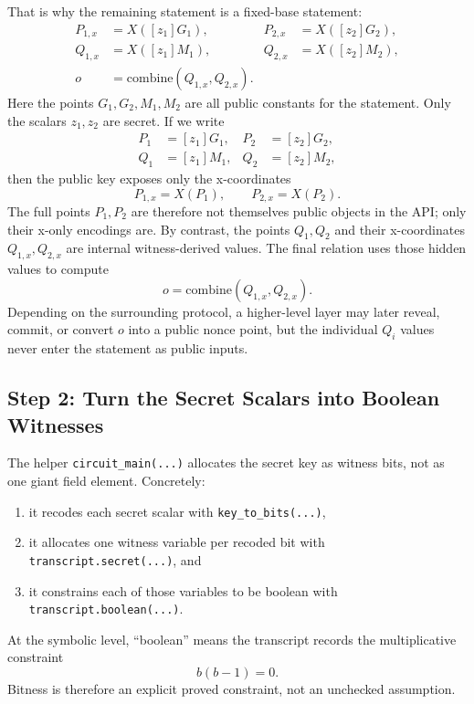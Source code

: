 \documentclass[11pt]{article}
\begin{document}
That is why the remaining statement is a fixed-base statement:
\[
\begin{aligned}
P_{1,x} &= X([z_1]G_1), & P_{2,x} &= X([z_2]G_2), \\
Q_{1,x} &= X([z_1]M_1), & Q_{2,x} &= X([z_2]M_2), \\
o &= \mathrm{combine}(Q_{1,x}, Q_{2,x}). &&
\end{aligned}
\]
Here the points $G_1,G_2,M_1,M_2$ are all public constants for the statement. Only the scalars
$z_1,z_2$ are secret. If we write
\[
\begin{aligned}
P_1 &= [z_1]G_1, & P_2 &= [z_2]G_2, \\
Q_1 &= [z_1]M_1, & Q_2 &= [z_2]M_2,
\end{aligned}
\]
then the public key exposes only the x-coordinates
\[
P_{1,x} = X(P_1), \qquad P_{2,x} = X(P_2).
\]
The full points $P_1,P_2$ are therefore not themselves public objects in the API; only their x-only
encodings are. By contrast, the points $Q_1,Q_2$ and their x-coordinates $Q_{1,x},Q_{2,x}$ are
internal witness-derived values. The final relation uses those hidden values to compute
\[
o = \mathrm{combine}(Q_{1,x}, Q_{2,x}).
\]
Depending on the surrounding protocol, a higher-level layer may later reveal, commit, or convert
$o$ into a public nonce point, but the individual $Q_i$ values never enter the statement as public
inputs.

\subsection{Step 2: Turn the Secret Scalars into Boolean Witnesses}

The helper \texttt{circuit\_main(...)} allocates the secret key as witness bits, not as one giant
field element. Concretely:
\begin{enumerate}
  \item it recodes each secret scalar with \texttt{key\_to\_bits(...)},
  \item it allocates one witness variable per recoded bit with
  \texttt{transcript.secret(...)}, and
  \item it constrains each of those variables to be boolean with
  \texttt{transcript.boolean(...)}.
\end{enumerate}

At the symbolic level, ``boolean'' means the transcript records the multiplicative constraint
\[
b(b-1)=0.
\]
Bitness is therefore an explicit proved constraint, not an unchecked assumption.
\end{document}
